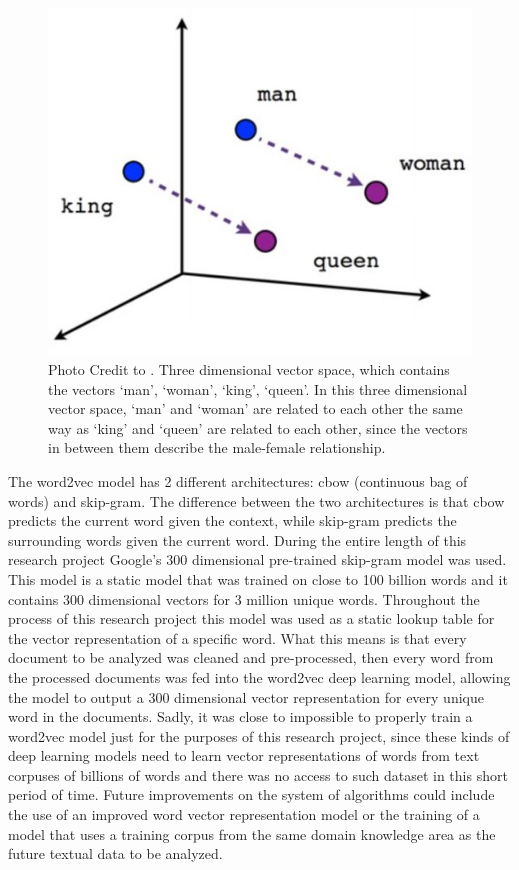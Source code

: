 \documentclass{sig-alternate}
\begin{document}
\begin{figure}
\centering
\includegraphics[scale=0.60]{images/vectorSpace.JPG}
\caption{Photo Credit to \cite{Vidhya}. Three dimensional vector space, which contains the vectors `man', `woman', `king', `queen'. In this three dimensional vector space,  `man' and `woman' are related to each other the same way as `king' and `queen' are related to each other, since the vectors in between them describe the male-female relationship.}
\end{figure}

The word2vec model has 2 different architectures: cbow (continuous bag of words) and skip-gram. The difference between the two architectures is that cbow predicts the current word given the context, while skip-gram predicts the surrounding words given the current word. During the entire length of this research project Google's 300 dimensional pre-trained skip-gram model\cite{MikolovChenCorradoDean2013a} was used. This model is a static model that was trained on close to 100 billion words and it contains 300 dimensional vectors for 3 million unique words. 
Throughout the process of this research project this model was used as a static lookup table for the vector representation of a specific word. What this means is that every document to be analyzed was cleaned and pre-processed, then every word from the processed documents was fed into the word2vec deep learning model, allowing the model to output a 300 dimensional vector representation for every unique word in the documents. Sadly, it was close to impossible to properly train a word2vec model just for the purposes of this research project, since these kinds of deep learning models need to learn vector representations of words from text corpuses of billions of words and there was no access to such dataset in this short period of time. Future improvements on the system of algorithms could include the use of an improved word vector representation model or the training of a model that uses a training corpus from the same domain knowledge area as the future textual data to be analyzed.
\end{document}

